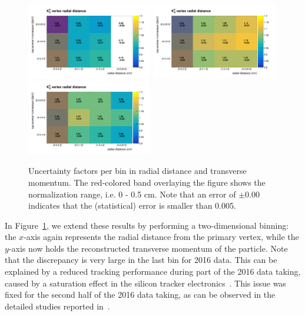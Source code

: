 \begin{figure}[h!]
	\centering	
	\includegraphics[width=0.49\textwidth]{Figures/c6/efficiencies/2dplots/2016tot/smallrange.pdf}
	\includegraphics[width=0.49\textwidth]{Figures/c6/efficiencies/2dplots/2017tot/smallrange.pdf}\\
	\includegraphics[width=0.49\textwidth]{Figures/c6/efficiencies/2dplots/2018tot/smallrange.pdf}
	\caption{Uncertainty factors per bin in radial distance and
          transverse momentum. The red-colored band overlaying the
          figure shows the normalization range, i.e. 0 - 0.5 cm. Note
          that an error of $\pm 0.00$ indicates that the (statistical)
          error is smaller than 0.005. \luka}
	\label{fig:2dplots}
\end{figure}
In Figure~\ref{fig:2dplots}, we extend these results by performing a
two-dimensional binning: the $x$-axis again represents the radial
distance from the primary vertex, while the $y$-axis now holds the
reconstructed transverse momentum of the particle. 
Note that the discrepancy is very large in the last bin for 2016
data. This can be explained by a reduced tracking performance during
part of the 2016 data taking, caused by a saturation effect in the
silicon tracker electronics~\cite{hipeffect}. This issue was fixed for
the second half of the 2016 data taking, as can be observed in the
detailed studies reported in~\cite{AN-20-111_KshortStudy}.



